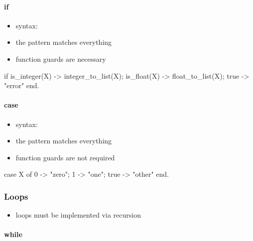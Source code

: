 \documentclass[a4paper,landscape,10pt]{article}
\begin{document}
\begin{multicols*}{2}
  \breakcolumn

  \paragraph{if}

  \begin{itemize}
    \item syntax: 
    \item the  pattern matches everything
    \item function guards are necessary
  \end{itemize}

  \begin{erlang}
if
  is_integer(X) -> integer_to_list(X);
  is_float(X) -> float_to_list(X);
  true -> "error" %
end.
\end{erlang}

  \paragraph{case}

  \begin{itemize}
    \item syntax: 
    \item the  pattern matches everything
    \item function guards are not required
  \end{itemize}

  \begin{erlang}
case X of
  0 -> "zero";
  1 -> "one";
  true -> "other"
end.
\end{erlang}

  \subsubsection{Loops}

  \begin{itemize}
    \item loops must be implemented via recursion
  \end{itemize}

  \paragraph{while}


\end{multicols*}
\end{document}
